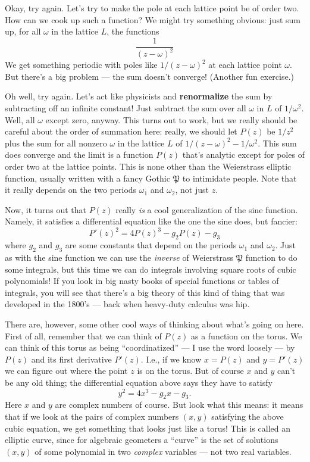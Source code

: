\documentclass[12pt]{article}
\begin{document}
Okay, try again. Let's try to make the pole at each lattice point be of
order two. How can we cook up such a function? We might try something
obvious: just sum up, for all \(\omega\) in the lattice \(L\), the
functions \[\frac{1}{(z -\omega)^2}\] We get something periodic with
poles like \(1/(z -\omega)^2\) at each lattice point \(\omega\). But
there's a big problem --- the sum doesn't converge! (Another fun
exercise.)

Oh well, try again. Let's act like physicists and \textbf{renormalize}
the sum by subtracting off an infinite constant! Just subtract the sum
over all \(\omega\) in \(L\) of \(1/\omega^2\). Well, all \(\omega\)
except zero, anyway. This turns out to work, but we really should be
careful about the order of summation here: really, we should let
\(P(z)\) be \(1/z^2\) plus the sum for all nonzero \(\omega\) in the
lattice \(L\) of \(1/(z -\omega)^2 -1/\omega^2\). This sum does converge
and the limit is a function \(P(z)\) that's analytic except for poles of
order two at the lattice points. This is none other than the Weierstrass
elliptic function, usually written with a fancy Gothic \(\mathfrak{P}\)
to intimidate people. Note that it really depends on the two periods
\(\omega_1\) and \(\omega_2\), not just \(z\).

Now, it turns out that \(P(z)\) really \emph{is} a cool generalization
of the sine function. Namely, it satisfies a differential equation like
the one the sine does, but fancier:
\[P'(z)^2 = 4 P(z)^3 - g_2 P(z) - g_3\] 
where \(g_2\) and \(g_3\)
are some constants that depend on the periods \(\omega_1\) and
\(\omega_2\). Just as with the sine function we can use the
\emph{inverse} of Weierstrass \(\mathfrak{P}\) function to do some
integrals, but this time we can do integrals involving square roots of
cubic polynomials! If you look in big nasty books of special functions
or tables of integrals, you will see that there's a big theory of this
kind of thing that was developed in the 1800's --- back when heavy-duty
calculus was hip.

There are, however, some other cool ways of thinking about what's going
on here. First of all, remember that we can think of \(P(z)\) as a
function on the torus. We can think of this torus as being
``coordinatized'' --- I use the word loosely --- by \(P(z)\) and its
first derivative \(P'(z)\). I.e., if we know \(x = P(z)\) and
\(y = P'(z)\) we can figure out where the point \(z\) is on the torus.
But of course \(x\) and \(y\) can't be any old thing; the differential
equation above says they have to satisfy \[y^2 = 4x^3 -g_2 x -g_3.\]
Here \(x\) and \(y\) are complex numbers of course. But look what this
means: it means that if we look at the pairs of complex numbers
\((x,y)\) satisfying the above cubic equation, we get something that
looks just like a torus! This is called an elliptic curve, since for
algebraic geometers a ``curve'' is the set of solutions \((x,y)\) of
some polynomial in two \emph{complex} variables --- not two real
variables.
\end{document}
